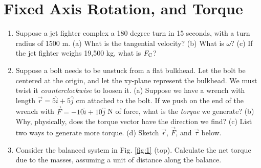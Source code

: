 \documentclass{article}
\begin{document}
\section{Fixed Axis Rotation, and Torque}

\begin{enumerate}
\item Suppose a jet fighter complex a 180 degree turn in 15 seconds, with a turn radius of 1500 m. (a) What is the tangential velocity? (b) What is $\omega$? (c) If the jet fighter weighs 19,500 kg, what is $F_{\rm C}$?  \\ \vspace{2cm}
\item Suppose a bolt needs to be unstuck from a flat bulkhead.  Let the bolt be centered at the origin, and let the xy-plane represent the bulkhead.  We must twist it \textit{counterclockwise} to loosen it.  (a) Suppose we have a wrench with length $\vec{r} = 5\hat{i} + 5\hat{j}$ cm attached to the bolt.  If we push on the end of the wrench with $\vec{F} = -10\hat{i}+10\hat{j}$ N of force, what is the \textit{torque} we generate? (b) Why, physically, does the torque vector have the direction we find? (c) List two ways to generate more torque. (d) Sketch $\vec{r}$, $\vec{F}$, and $\vec{\tau}$ below. \\ \vspace{4cm}
\item Consider the balanced system in Fig. \ref{fig:1} (top).  Calculate the net torque due to the masses, assuming a unit of distance along the balance. \\ \vspace{2cm}
\end{enumerate}
\end{document}
